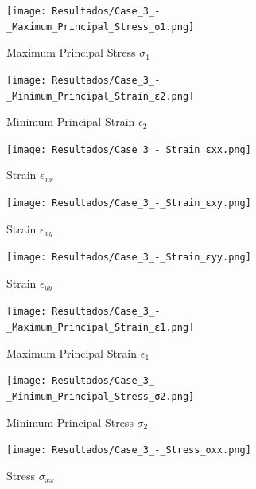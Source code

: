 \documentclass[12pt]{article}
\begin{document}
\begin{figure}[H]
    \centering
    \begin{minipage}{0.48\textwidth}
        \centering
        \texttt{[image: Resultados/Case\_3\_-\_Maximum\_Principal\_Stress\_σ1.png]}
        \caption{Maximum Principal Stress $\sigma_1$}
        \label{fig:fig24}
    \end{minipage}
    \hfill
    \begin{minipage}{0.48\textwidth}
        \centering
        \texttt{[image: Resultados/Case\_3\_-\_Minimum\_Principal\_Strain\_ε2.png]}
        \caption{Minimum Principal Strain $\epsilon_2$}
        \label{fig:fig25}
    \end{minipage}
\end{figure}

\begin{figure}[H]
    \centering
    \begin{minipage}{0.48\textwidth}
        \centering
        \texttt{[image: Resultados/Case\_3\_-\_Strain\_εxx.png]}
        \caption{Strain $\epsilon_{xx}$}
        \label{fig:fig26}
    \end{minipage}
    \hfill
    \begin{minipage}{0.48\textwidth}
        \centering
        \texttt{[image: Resultados/Case\_3\_-\_Strain\_εxy.png]}
        \caption{Strain $\epsilon_{xy}$}
        \label{fig:fig27}
    \end{minipage}
\end{figure}

\begin{figure}[H]
    \centering
    \begin{minipage}{0.48\textwidth}
        \centering
        \texttt{[image: Resultados/Case\_3\_-\_Strain\_εyy.png]}
        \caption{Strain $\epsilon_{yy}$}
        \label{fig:fig28}
    \end{minipage}
    \hfill
    \begin{minipage}{0.48\textwidth}
        \centering
        \texttt{[image: Resultados/Case\_3\_-\_Maximum\_Principal\_Strain\_ε1.png]}
        \caption{Maximum Principal Strain $\epsilon_1$}
        \label{fig:fig29}
    \end{minipage}
\end{figure}

\begin{figure}[H]
    \centering
    \begin{minipage}{0.48\textwidth}
        \centering
        \texttt{[image: Resultados/Case\_3\_-\_Minimum\_Principal\_Stress\_σ2.png]}
        \caption{Minimum Principal Stress $\sigma_2$}
        \label{fig:fig30}
    \end{minipage}
    \hfill
    \begin{minipage}{0.48\textwidth}
        \centering
        \texttt{[image: Resultados/Case\_3\_-\_Stress\_σxx.png]}
        \caption{Stress $\sigma_{xx}$}
        \label{fig:fig31}
    \end{minipage}
\end{figure}
\end{document}
